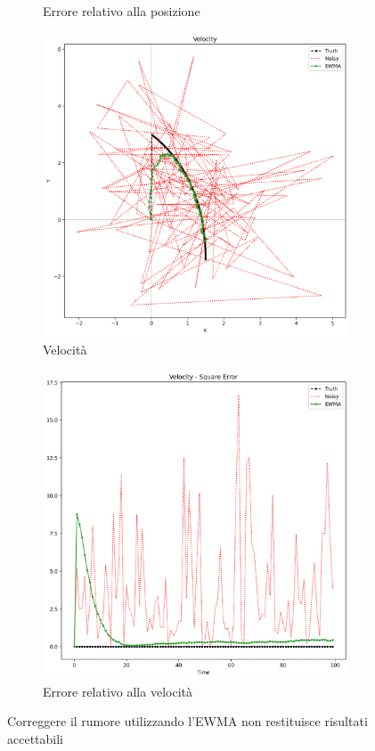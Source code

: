 \begin{figure}
\begin{subfigure}[b]{0.45\textwidth}
        \caption{Errore relativo alla posizione}
    \end{subfigure}
    \vfill
    \begin{subfigure}[b]{0.45\textwidth}
        \includegraphics[width=\textwidth]{images/vel0.png}
        \caption{Velocità}
    \end{subfigure}
    \hfill
    \begin{subfigure}[b]{0.45\textwidth}
        \includegraphics[width=\textwidth]{images/vel0err.png}
        \caption{Errore relativo alla velocità}
    \end{subfigure}
    \caption{Correggere il rumore utilizzando l'EWMA non restituisce risultati accettabili}
    \label{fig:lag}
\end{figure}

